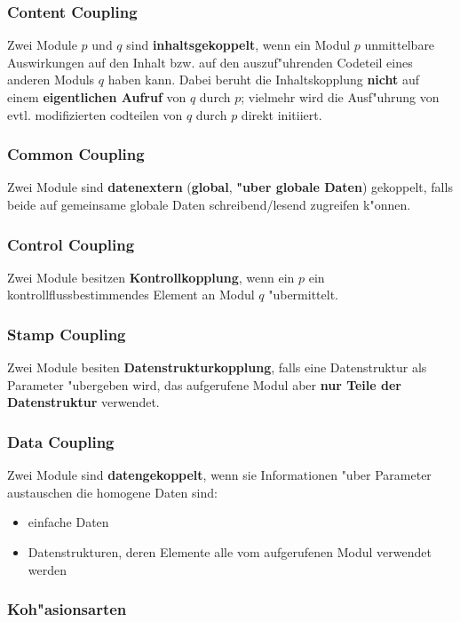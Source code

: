 \subsubsection{Content Coupling}
Zwei Module $p$ und $q$ sind \textbf{inhaltsgekoppelt}, wenn ein Modul $p$ unmittelbare Auswirkungen auf den Inhalt bzw. auf den auszuf"uhrenden Codeteil eines anderen Moduls $q$ haben kann.
Dabei beruht die Inhaltskopplung \textbf{nicht} auf einem \textbf{eigentlichen Aufruf} von $q$ durch $p$; vielmehr wird die Ausf"uhrung von evtl. modifizierten codteilen von $q$ durch $p$ direkt initiiert.

\subsubsection{Common Coupling}
Zwei Module sind \textbf{datenextern} (\textbf{global}, \textbf{"uber globale Daten}) gekoppelt, falls beide auf gemeinsame globale Daten schreibend/lesend zugreifen k"onnen.

\subsubsection{Control Coupling}
Zwei Module besitzen \textbf{Kontrollkopplung}, wenn ein $p$ ein kontrollflussbestimmendes Element an Modul $q$ "ubermittelt.

\subsubsection{Stamp Coupling}
Zwei Module besiten \textbf{Datenstrukturkopplung}, falls eine Datenstruktur als Parameter "ubergeben wird, das aufgerufene Modul aber \textbf{nur Teile der Datenstruktur} verwendet.

\subsubsection{Data Coupling}
Zwei Module sind \textbf{datengekoppelt}, wenn sie Informationen "uber Parameter austauschen die homogene Daten sind:
\begin{itemize}
    \item einfache Daten
    \item Datenstrukturen, deren Elemente alle vom aufgerufenen Modul verwendet werden
\end{itemize}


\subsubsection{Koh"asionsarten}

